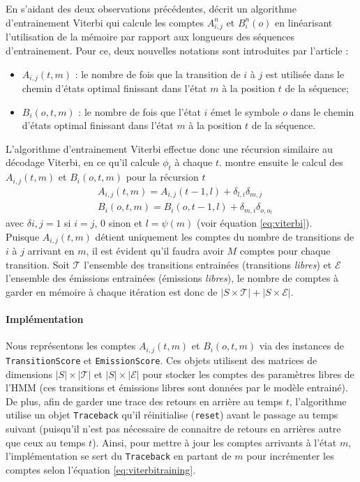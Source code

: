 \documentclass[letterpaper]{article}
\begin{document}
En s'aidant des deux observations précédentes, \cite{LM} décrit un algorithme d'entrainement Viterbi qui calcule les comptes $A_{i,j}^n$ et $B_i^n(o)$ en linéarisant l'utilisation de la mémoire par rapport aux longueurs des séquences d'entrainement. Pour ce, deux nouvelles notations sont introduites par l'article : 
\begin{itemize}
	\item $A_{i,j}(t, m)$ : le nombre de fois que la transition de $i$ à $j$ est utilisée dans le chemin d'états optimal finissant dans l'état $m$ à la position $t$ de la séquence; 
	\item $B_i(o, t, m)$ : le nombre de fois que l'état $i$ émet le symbole $o$ dans le chemin d'états optimal finissant dans l'état $m$ à la position $t$ de la séquence. \\
\end{itemize} 

L'algorithme d'entrainement Viterbi effectue donc une récursion similaire au décodage Viterbi, en ce qu'il calcule $\phi_t$ à chaque $t$. \cite{LM} montre ensuite le calcul des  $A_{i,j}(t, m)$ et $B_i(o, t, m)$ pour la récursion $t$
\begin{equation} \label{eq:viterbitraining}
\begin{aligned}
	& A_{i,j}(t, m) = A_{i,j}(t-1, l) + \delta_{l,i}\delta_{m,j} \\
	& B_i(o, t, m) = B_i(o, t-1, l) + \delta_{m,i}\delta_{o,o_t}
\end{aligned}
\end{equation}
avec $\delta{i,j} = 1$ si $i=j$, 0 sinon et $l = \psi(m)$ (voir équation \ref{eq:viterbi}). \\

Puisque $A_{i,j}(t, m)$ détient uniquement les comptes du nombre de transitions de $i$ à $j$ arrivant en $m$, il est évident qu'il faudra avoir $M$ comptes pour chaque transition. Soit $\mathcal{T}$ l'ensemble des transitions entrainées (transitions \textit{libres}) et $\mathcal{E}$ l'ensemble des émissions entrainées (émissions \textit{libres}), le nombre de comptes à garder en mémoire à chaque itération est donc de $|S \times \mathcal{T}| + |S \times \mathcal{E}|$. 

\paragraph{Implémentation}
Nous représentons les comptes $A_{i,j}(t, m)$ et $B_i(o, t, m)$ via des instances de \texttt{TransitionScore} et \texttt{EmissionScore}. Ces objets utilisent des matrices de dimensions $|S| \times |\mathcal{T}|$ et $|S| \times |\mathcal{E}|$ pour stocker les comptes des paramètres libres de l'HMM (ces transitions et émissions libres sont données par le modèle entrainé). De plus, afin de garder une trace des retours en arrière au temps $t$, l'algorithme utilise un objet \texttt{Traceback} qu'il réinitialise (\texttt{reset}) avant le passage au temps suivant (puisqu'il n'est pas nécessaire de connaitre de retours en arrières autre que ceux au temps $t$). Ainsi, pour mettre à jour les comptes arrivants à l'état $m$, l'implémentation se sert du \texttt{Traceback} en partant de $m$ pour incrémenter les comptes selon l'équation \ref{eq:viterbitraining}.
\end{document}
